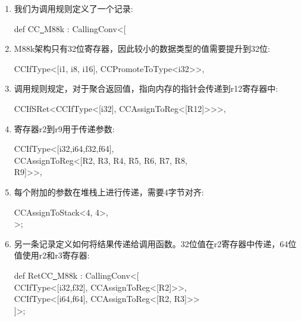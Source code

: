 \begin{enumerate}
\item 我们为调用规则定义了一个记录:
\begin{tcolorbox}[colback=white,colframe=black]
def CC\underline{~}M88k : CallingConv<[
\end{tcolorbox}

\item M88k架构只有32位寄存器，因此较小的数据类型的值需要提升到32位:
\begin{tcolorbox}[colback=white,colframe=black]
\hspace*{0.5cm}CCIfType<[i1, i8, i16], CCPromoteToType<i32>>,
\end{tcolorbox}

\item 调用规则规定，对于聚合返回值，指向内存的指针会传递到r12寄存器中:
\begin{tcolorbox}[colback=white,colframe=black]
\hspace*{0.5cm}CCIfSRet<CCIfType<[i32], CCAssignToReg<[R12]>>>,
\end{tcolorbox}

\item 寄存器r2到r9用于传递参数:
\begin{tcolorbox}[colback=white,colframe=black]
\hspace*{0.5cm}CCIfType<[i32,i64,f32,f64], \\
\hspace*{1cm}CCAssignToReg<[R2, R3, R4, R5, R6, R7, R8, \\
\hspace*{1.5cm}R9]>>, 
\end{tcolorbox}

\item 每个附加的参数在堆栈上进行传递，需要4字节对齐:
\begin{tcolorbox}[colback=white,colframe=black]
\hspace*{0.5cm}CCAssignToStack<4, 4>, \\
>;
\end{tcolorbox}

\item 另一条记录定义如何将结果传递给调用函数。32位值在r2寄存器中传递，64位值使用r2和r3寄存器:
\begin{tcolorbox}[colback=white,colframe=black]
def RetCC\underline{~}M88k : CallingConv<[ \\
\hspace*{0.5cm}CCIfType<[i32,f32], CCAssignToReg<[R2]>>, \\
\hspace*{0.5cm}CCIfType<[i64,f64], CCAssignToReg<[R2, R3]>> \\
]>;
\end{tcolorbox}


\end{enumerate}
